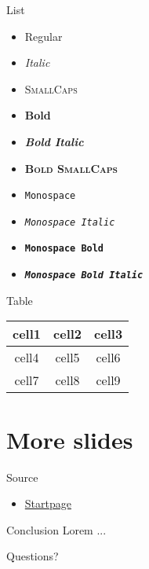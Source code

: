 \documentclass{beamer}
\begin{document}
    \begin{frame}{List}
        \begin{itemize}
            \item Regular
            \item \textit{Italic}
            \item \textsc{SmallCaps}
            \item \textbf{Bold}
            \item \textbf{\textit{Bold Italic}}
            \item \textbf{\textsc{Bold SmallCaps}}
            \item \texttt{Monospace}
            \item \texttt{\textit{Monospace Italic}}
            \item \texttt{\textbf{Monospace Bold}}
            \item \texttt{\textbf{\textit{Monospace Bold Italic}}}
        \end{itemize}
    \end{frame}

    \begin{frame}{Table}
        \begin{center}
        \begin{tabular}{ |c|c|c| } 
        \hline
        \textbf{cell1} & \textbf{cell2} & \textbf{cell3} \\ \hline
        cell4 & \alert{cell5} & cell6 \\ \hline
        cell7 & cell8 & cell9 \\ \hline
        \end{tabular}
        \end{center}
    \end{frame}

\section{More slides}

    \begin{frame}{Source}
        \begin{itemize}
        \item \href{https://www.startpage.com/}{Startpage}
        \end{itemize}
    \end{frame}

    \begin{frame}{Conclusion}
        Lorem ...
    \end{frame}

    {
    \begin{frame}[standout]
    Questions?
    \end{frame}
    }
	
\end{document}
